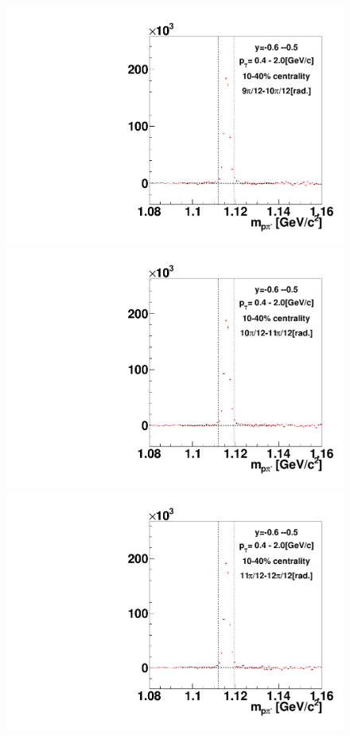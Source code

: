 \begin{figure}[h]
\includegraphics[width=0.14\linewidth]{chapterX/fig/ld_v1_sig/kf_ptslice0_cent1_ld_flow_phi10_rap10.pdf}
\includegraphics[width=0.14\linewidth]{chapterX/fig/ld_v1_sig/kf_ptslice0_cent1_ld_flow_phi11_rap10.pdf}
\includegraphics[width=0.14\linewidth]{chapterX/fig/ld_v1_sig/kf_ptslice0_cent1_ld_flow_phi12_rap10.pdf}


\end{figure}
